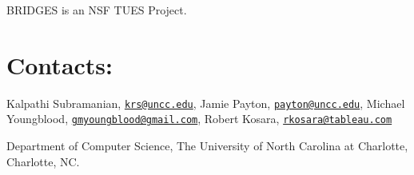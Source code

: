 B\+R\+I\+D\+G\+E\+S is an N\+S\+F T\+U\+E\+S Project.\hypertarget{index_contacts_sec}{}\section{Contacts\+:}\label{index_contacts_sec}
Kalpathi Subramanian, \href{mailto:krs@uncc.edu}{\tt krs@uncc.\+edu}, Jamie Payton, \href{mailto:payton@uncc.edu}{\tt payton@uncc.\+edu}, Michael Youngblood, \href{mailto:gmyoungblood@gmail.com}{\tt gmyoungblood@gmail.\+com}, Robert Kosara, \href{mailto:rkosara@tableau.com}{\tt rkosara@tableau.\+com}

Department of Computer Science, The University of North Carolina at Charlotte, Charlotte, N\+C. 